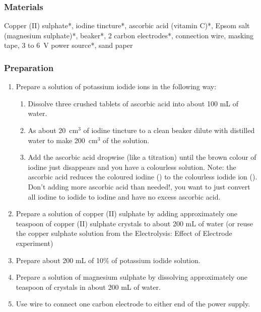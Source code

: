 \subsubsection*{Materials}
Copper (II) sulphate*, iodine tincture*, ascorbic acid (vitamin C)*, Epsom salt (magnesium sulphate)*, beaker*, 2 carbon electrodes*, connection wire, masking tape, 3 to 6~V power source*, sand paper

\subsubsection*{Preparation}
\begin{enumerate}
\item{Prepare a solution of potassium iodide ions in the following way:
\begin{enumerate}
\item{Dissolve three crushed tablets of ascorbic acid into about 100 mL of water.}
\item{As about 20~cm$^{3}$ of iodine tincture to a clean beaker dilute with distilled water to make 200~cm$^{3}$ of the solution.}
\item{ Add the ascorbic acid dropwise (like a titration) until the brown colour of iodine just disappears and you have a colourless solution.} Note: the ascorbic acid reduces the coloured iodine () to the colourless iodide ion (). Don't adding more ascorbic acid than needed!, you want to just convert all iodine to iodide to iodine and have no excess ascorbic acid.
\end{enumerate}}

\item{Prepare a solution of copper (II) sulphate by adding approximately one teaspoon of copper (II) sulphate crystals to about 200 mL of water (or reuse the copper sulphate solution from the Electrolysis: Effect of Electrode experiment)}
\item{Prepare about 200 mL of 10\% of potassium iodide solution.}
\item{Prepare a solution of magnesium sulphate by dissolving approximately one teaspoon of crystals in about 200 mL of water.}
\item{Use wire to connect one carbon electrode to either end of the power supply.}

\end{enumerate}

